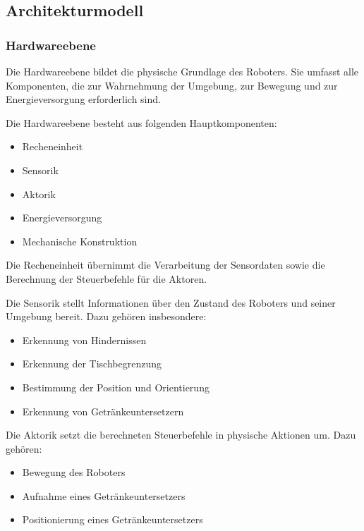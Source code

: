 \subsection{Architekturmodell}\label{architekturmodell}

\subsubsection{Hardwareebene}\label{hardwareebene-1}

Die Hardwareebene bildet die physische Grundlage des Roboters. Sie
umfasst alle Komponenten, die zur Wahrnehmung der Umgebung, zur Bewegung
und zur Energieversorgung erforderlich sind.

Die Hardwareebene besteht aus folgenden Hauptkomponenten:

\begin{itemize}
\tightlist
\item
  Recheneinheit
\item
  Sensorik
\item
  Aktorik
\item
  Energieversorgung
\item
  Mechanische Konstruktion
\end{itemize}

Die Recheneinheit übernimmt die Verarbeitung der Sensordaten sowie die
Berechnung der Steuerbefehle für die Aktoren.

Die Sensorik stellt Informationen über den Zustand des Roboters und
seiner Umgebung bereit. Dazu gehören insbesondere:

\begin{itemize}
\tightlist
\item
  Erkennung von Hindernissen
\item
  Erkennung der Tischbegrenzung
\item
  Bestimmung der Position und Orientierung
\item
  Erkennung von Getränkeuntersetzern
\end{itemize}

Die Aktorik setzt die berechneten Steuerbefehle in physische Aktionen
um. Dazu gehören:

\begin{itemize}
\tightlist
\item
  Bewegung des Roboters
\item
  Aufnahme eines Getränkeuntersetzers
\item
  Positionierung eines Getränkeuntersetzers
\end{itemize}

